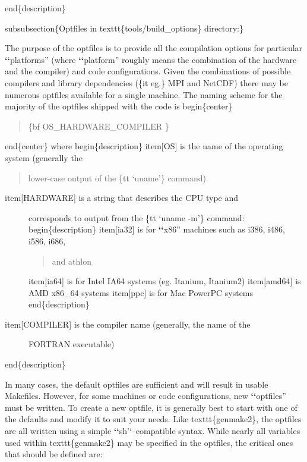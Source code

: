 \documentclass[letterpaper,10pt,english]{sphinxmanual}
\begin{document}
end\{description\}

subsubsection\{Optfiles in texttt\{tools/build\_options\} directory:\}

The purpose of the optfiles is to provide all the compilation options
for particular {\color{red}\bfseries{}{}`{}`}platforms'' (where {\color{red}\bfseries{}{}`{}`}platform'' roughly means the
combination of the hardware and the compiler) and code configurations.
Given the combinations of possible compilers and library dependencies
(\{it eg.\}  MPI and NetCDF) there may be numerous optfiles available
for a single machine.  The naming scheme for the majority of the
optfiles shipped with the code is
begin\{center\}
\begin{quote}

\{bf OS\_HARDWARE\_COMPILER \}
\end{quote}

end\{center\}
where
begin\{description\}
item{[}OS{]} is the name of the operating system (generally the
\begin{quote}

lower-case output of the \{tt `uname'\} command)
\end{quote}
\begin{description}
\item[{item{[}HARDWARE{]} is a string that describes the CPU type and}] \leavevmode
corresponds to output from the  \{tt `uname -m'\} command:
begin\{description\}
item{[}ia32{]} is for {\color{red}\bfseries{}{}`{}`}x86'' machines such as i386, i486, i586, i686,
\begin{quote}

and athlon
\end{quote}

item{[}ia64{]} is for Intel IA64 systems (eg. Itanium, Itanium2)
item{[}amd64{]} is AMD x86\_64 systems
item{[}ppc{]} is for Mac PowerPC systems
end\{description\}

\item[{item{[}COMPILER{]} is the compiler name (generally, the name of the}] \leavevmode
FORTRAN executable)

\end{description}

end\{description\}

In many cases, the default optfiles are sufficient and will result in
usable Makefiles.  However, for some machines or code configurations,
new {\color{red}\bfseries{}{}`{}`}optfiles'' must be written. To create a new optfile, it is
generally best to start with one of the defaults and modify it to suit
your needs.  Like texttt\{genmake2\}, the optfiles are all written
using a simple {\color{red}\bfseries{}{}`{}`}sh'`--compatible syntax.  While nearly all variables
used within texttt\{genmake2\} may be specified in the optfiles, the
critical ones that should be defined are:
\end{document}
